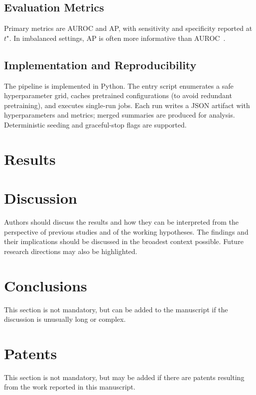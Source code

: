 \documentclass[journal,article,submit,pdftex,moreauthors]{Definitions/mdpi}
\begin{document}
\subsection{Evaluation Metrics}
Primary metrics are AUROC and AP, with sensitivity and specificity reported at $t^\star$. In imbalanced settings, AP is often more informative than AUROC~\citep{Saito2015_PR}.

\subsection{Implementation and Reproducibility}
The pipeline is implemented in Python. The entry script enumerates a safe hyperparameter grid, caches pretrained configurations (to avoid redundant pretraining), and executes single-run jobs. Each run writes a JSON artifact with hyperparameters and metrics; merged summaries are produced for analysis. Deterministic seeding and graceful-stop flags are supported.




\section{Results}


\section{Discussion}

Authors should discuss the results and how they can be interpreted from the perspective of previous studies and of the working hypotheses. The findings and their implications should be discussed in the broadest context possible. Future research directions may also be highlighted.

\section{Conclusions}

This section is not mandatory, but can be added to the manuscript if the discussion is unusually long or complex.

\section{Patents}

This section is not mandatory, but may be added if there are patents resulting from the work reported in this manuscript.
\end{document}

